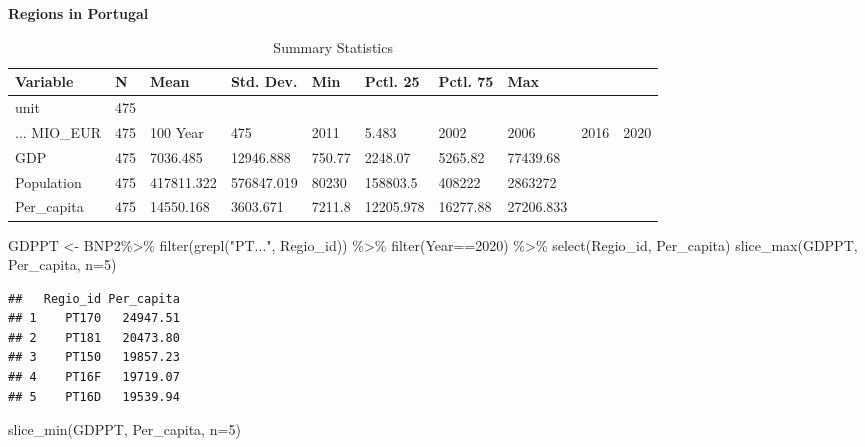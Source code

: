 \documentclass[
]{article}
\newenvironment{Shaded}{\begin{snugshade}}{\end{snugshade}}
\newcommand{\AttributeTok}[1]{\textcolor[rgb]{0.77,0.63,0.00}{#1}}
\newcommand{\DecValTok}[1]{\textcolor[rgb]{0.00,0.00,0.81}{#1}}
\newcommand{\FunctionTok}[1]{\textcolor[rgb]{0.00,0.00,0.00}{#1}}
\newcommand{\NormalTok}[1]{#1}
\newcommand{\OtherTok}[1]{\textcolor[rgb]{0.56,0.35,0.01}{#1}}
\newcommand{\SpecialCharTok}[1]{\textcolor[rgb]{0.00,0.00,0.00}{#1}}
\newcommand{\StringTok}[1]{\textcolor[rgb]{0.31,0.60,0.02}{#1}}
\begin{document}
\textbf{Regions in Portugal}

\begin{table}

\caption{\label{tab:unnamed-chunk-10}Summary Statistics}
\centering
\begin{tabular}[t]{llllllll}
\toprule
Variable & N & Mean & Std. Dev. & Min & Pctl. 25 & Pctl. 75 & Max\\
\midrule
unit & 475 &  &  &  &  &  & \\
... MIO_EUR & 475 & 100%
Year & 475 & 2011 & 5.483 & 2002 & 2006 & 2016 & 2020\\
GDP & 475 & 7036.485 & 12946.888 & 750.77 & 2248.07 & 5265.82 & 77439.68\\
Population & 475 & 417811.322 & 576847.019 & 80230 & 158803.5 & 408222 & 2863272\\
\addlinespace
Per_capita & 475 & 14550.168 & 3603.671 & 7211.8 & 12205.978 & 16277.88 & 27206.833\\
\bottomrule
\end{tabular}
\end{table}

\begin{Shaded}
\begin{Highlighting}[]
\NormalTok{GDPPT }\OtherTok{\textless{}{-}}\NormalTok{ BNP2}\SpecialCharTok{\%\textgreater{}\%}
  \FunctionTok{filter}\NormalTok{(}\FunctionTok{grepl}\NormalTok{(}\StringTok{"PT..."}\NormalTok{, Regio\_id)) }\SpecialCharTok{\%\textgreater{}\%}
  \FunctionTok{filter}\NormalTok{(Year}\SpecialCharTok{==}\DecValTok{2020}\NormalTok{) }\SpecialCharTok{\%\textgreater{}\%}
  \FunctionTok{select}\NormalTok{(Regio\_id, Per\_capita)}
\FunctionTok{slice\_max}\NormalTok{(GDPPT, Per\_capita, }\AttributeTok{n=}\DecValTok{5}\NormalTok{)}
\end{Highlighting}
\end{Shaded}

\begin{verbatim}
##   Regio_id Per_capita
## 1    PT170   24947.51
## 2    PT181   20473.80
## 3    PT150   19857.23
## 4    PT16F   19719.07
## 5    PT16D   19539.94
\end{verbatim}

\begin{Shaded}
\begin{Highlighting}[]
\FunctionTok{slice\_min}\NormalTok{(GDPPT, Per\_capita, }\AttributeTok{n=}\DecValTok{5}\NormalTok{)}
\end{Highlighting}
\end{Shaded}
\end{document}
